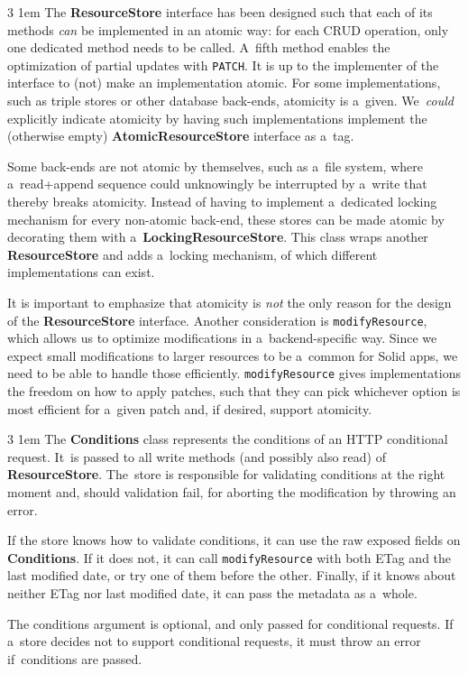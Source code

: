 \documentclass[10pt]{article}
\newcommand\component[1]{\mbox{\bf #1}}
\newcommand\field[1]{\mbox{\tt #1}}
\newenvironment{Note}
  {\begin{multicols}{3}%
     \parskip 1em}
  {\end{multicols}}
\begin{document}
\begin{Note}
The \component{ResourceStore} interface has been designed
such that each of its methods \emph{can} be implemented
in an atomic way:
for each CRUD operation,
only one dedicated method needs to be called.
A~fifth method enables the optimization of partial updates
with \verb!PATCH!.
It is up to the implementer of the interface
to (not) make an implementation atomic.
For some implementations,
such as triple stores or other database back-ends,
atomicity is a~given.
We~\emph{could} explicitly indicate atomicity
by having such implementations
implement the (otherwise empty) \component{AtomicResourceStore} interface
as a~tag.

\columnbreak

Some back-ends are not atomic by themselves,
such as a~file system,
where a~read+append sequence could unknowingly
be interrupted by a~write
that thereby breaks atomicity.
Instead of having to implement
a~dedicated locking mechanism for every non-atomic back-end,
these stores can be made atomic
by decorating them with a~\component{LockingResourceStore}.
This class wraps another \component{ResourceStore}
and adds a~locking mechanism,
of which different implementations can exist.

\columnbreak

It is important to emphasize
that atomicity is \emph{not} the only reason
for the design of the \component{ResourceStore} interface.
Another consideration is \field{modifyResource},
which allows us to optimize modifications in a~backend-specific way.
Since we expect small modifications to larger resources
to be a~common for Solid apps,
we need to be able to handle those efficiently.
\field{modifyResource} gives implementations the freedom
on how to apply patches,
such that they can pick whichever option is most efficient
for a~given patch
and, if desired, support atomicity.

\end{Note}

\begin{Note}
The \component{Conditions} class
represents the conditions of an HTTP conditional request.
It~is passed to all write methods
(and possibly also read) of \component{ResourceStore}.
The~store is responsible for validating conditions
at the right moment
and, should validation fail,
for aborting the modification by throwing an error.

\columnbreak
If the store knows how to validate conditions,
it can use the raw exposed fields on \component{Conditions}.
If it does not,
it can call \field{modifyResource}
with both ETag and the last modified date,
or try one of them before the other.
Finally,
if it knows about neither ETag nor last modified date,
it can pass the metadata as a~whole.

\columnbreak
The conditions argument is optional,
and only passed for conditional requests.
If a~store decides not to support conditional requests,
it must throw an error if~conditions are passed.

\end{Note}
\end{document}

